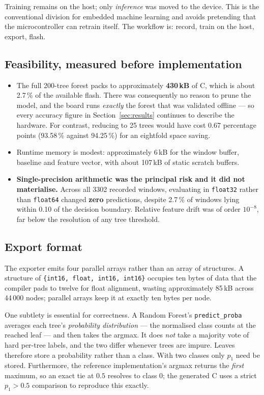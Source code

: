 \documentclass[11pt,a4paper]{article}
\newcommand{\code}[1]{\texttt{\small #1}}
\begin{document}
Training remains on the host; only \emph{inference} was moved to the device.
This is the conventional division for embedded machine learning and avoids
pretending that the microcontroller can retrain itself. The workflow is:
record, train on the host, export, flash.

\subsection{Feasibility, measured before implementation}

\begin{itemize}[leftmargin=1.4em, itemsep=3pt]
  \item The full 200-tree forest packs to approximately \textbf{430\,kB} of C,
        which is about 2.7\,\% of the available flash. There was consequently no
        reason to prune the model, and the board runs \emph{exactly} the forest
        that was validated offline --- so every accuracy figure in
        Section~\ref{sec:results} continues to describe the hardware. For
        contrast, reducing to 25 trees would have cost 0.67 percentage points
        (93.58\,\% against 94.25\,\%) for an eightfold space saving.
  \item Runtime memory is modest: approximately 6\,kB for the window buffer,
        baseline and feature vector, with about 107\,kB of static scratch
        buffers.
  \item \textbf{Single-precision arithmetic was the principal risk and it did
        not materialise.} Across all 3302 recorded windows, evaluating in
        \code{float32} rather than \code{float64} changed \textbf{zero}
        predictions, despite 2.7\,\% of windows lying within 0.10 of the
        decision boundary. Relative feature drift was of order $10^{-8}$, far
        below the resolution of any tree threshold.
\end{itemize}

\subsection{Export format}

The exporter emits four parallel arrays rather than an array of structures. A
structure of \code{\{int16, float, int16, int16\}} occupies ten bytes of data
that the compiler pads to twelve for float alignment, wasting approximately
85\,kB across 44\,000 nodes; parallel arrays keep it at exactly ten bytes per
node.

One subtlety is essential for correctness. A Random Forest's
\code{predict\_proba} averages each tree's \emph{probability distribution} ---
the normalised class counts at the reached leaf --- and then takes the
arg\-max. It does \emph{not} take a majority vote of hard per-tree labels, and
the two differ whenever trees are impure. Leaves therefore store a probability
rather than a class. With two classes only $p_1$ need be stored. Furthermore,
the reference implementation's arg\-max returns the \emph{first} maximum, so an
exact tie at $0.5$ resolves to class 0; the generated C uses a strict
$p_1 > 0.5$ comparison to reproduce this exactly.
\end{document}
